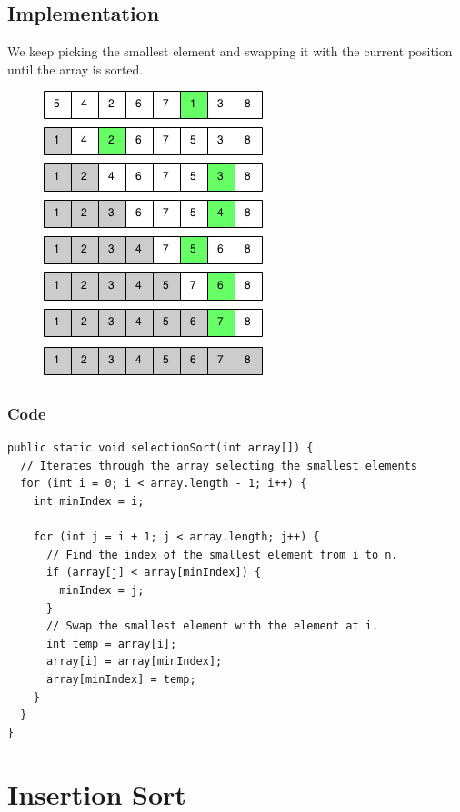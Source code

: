 \documentclass[11pt,oneside]{book}
\makeatletter
\def\maxwidth#1{\ifdim\Gin@nat@width>#1 #1\else\Gin@nat@width\fi}
\makeatother
\begin{document}
\subsection{Implementation}

We keep picking the smallest element and swapping it with the current position until the array is sorted.

\vspace{5px}\begin{figure}[H]\centering
        \includegraphics[width=0.66\maxwidth{\textwidth}]{selection_sort.png}
        \end{figure}

\subsubsection{Code}

\begin{lstlisting}
public static void selectionSort(int array[]) {
  // Iterates through the array selecting the smallest elements
  for (int i = 0; i < array.length - 1; i++) {
    int minIndex = i;

    for (int j = i + 1; j < array.length; j++) {
      // Find the index of the smallest element from i to n.
      if (array[j] < array[minIndex]) {
        minIndex = j;
      }
      // Swap the smallest element with the element at i.
      int temp = array[i];
      array[i] = array[minIndex];
      array[minIndex] = temp;
    }
  }
}

\end{lstlisting}

        \section{ Insertion Sort }
        
\end{document}
